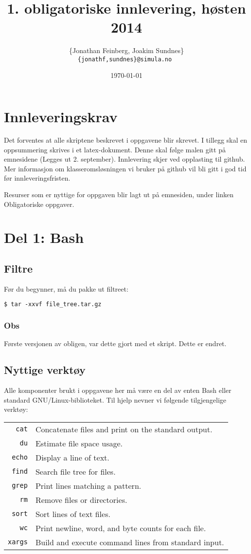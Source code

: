 \documentclass{article}
\author{
\{Jonathan Feinberg, Joakim Sundnes\} \\
\tt{\{jonathf,sundnes\}@simula.no}
}
\date{\today}
\title{1. obligatoriske innlevering, høsten 2014}
\begin{document}
\maketitle

\section*{Innleveringskrav}

Det forventes at alle skriptene beskrevet i oppgavene blir skrevet.
I tillegg skal en oppsummering skrives i et latex-dokument.
Denne skal følge malen gitt på emnesidene
(Legges ut 2. september).
Innlevering skjer ved opplasting til github. Mer informasjon om
klasseromsløsningen vi bruker på github vil bli gitt i god tid før
innleveringsfristen.

Resurser som er nyttige for oppgaven blir lagt ut på emnesiden,
under linken Obligatoriske oppgaver.

\section*{Del 1: Bash}

\subsection*{Filtre}
Før du begynner, må du pakke ut filtreet:
\begin{Verbatim}[fontsize=\small, frame=single]
$ tar -xxvf file_tree.tar.gz
\end{Verbatim}
\subsubsection*{Obs}
Første versjonen av obligen, var dette gjort med et skript.
Dette er endret.

\subsection*{Nyttige verktøy}
Alle komponenter brukt i oppgavene her må være en del av enten Bash
eller standard GNU/Linux-biblioteket.
Til hjelp nevner vi følgende tilgjengelige verktøy:

\begin{tabular}{rl}
    \verb;cat;      &   Concatenate files and print on the standard output. \\
    \verb;du;       &   Estimate file space usage. \\
    \verb;echo;     &   Display a line of text. \\
    \verb;find;     &   Search file tree for files. \\
    \verb;grep;     &   Print lines matching a pattern. \\
    \verb;rm;       &   Remove files or directories.\\
    \verb;sort;     &   Sort lines of text files. \\
    \verb;wc;       &   Print newline, word, and byte counts for each file. \\
    \verb;xargs;    &   Build and execute command lines from standard input.
\end{tabular}
\end{document}
